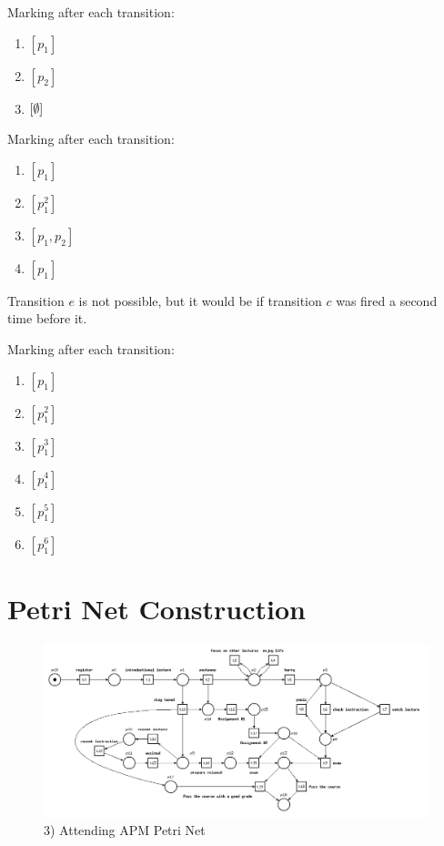 \documentclass[a4paper]{report}
\begin{document}
Marking after each transition:
\begin{enumerate}
	\item $\left[ p_1\right] $
	\item $\left[ p_2\right] $
	\item $\left[ \emptyset\right] $
\end{enumerate}
Marking after each transition:
\begin{enumerate}
	\item $\left[ p_1\right] $
	\item $\left[ p_1^{2}\right] $
	\item $\left[ p_1,p_2\right] $
	\item $\left[ p_1\right] $
\end{enumerate}
Transition $e$ is not possible, but it would be if transition $c$ was fired a second time before it.

Marking after each transition:
\begin{enumerate}
	\item $\left[ p_1\right] $
	\item $\left[ p_1^{2}\right] $
	\item $\left[ p_1^{3}\right] $
	\item $\left[ p_1^{4}\right] $
	\item $\left[ p_1^{5}\right] $
	\item $\left[ p_1^{6}\right] $
\end{enumerate}

\section*{Petri Net Construction}


\begin{figure}[H]
    \centering
    \includegraphics[width=1\textwidth]{figures/ex1_3.png}
    \caption{3) Attending APM Petri Net}
    \label{fig:ex1_3}
\end{figure}
\end{document}
